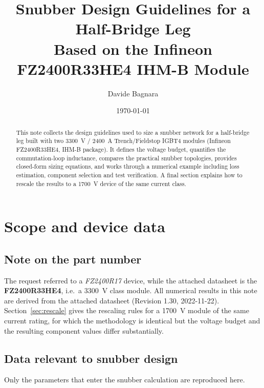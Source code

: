 \documentclass[11pt,a4paper]{article}
\title{Snubber Design Guidelines for a Half-Bridge Leg\\
Based on the Infineon FZ2400R33HE4 IHM-B Module}
\author{Davide Bagnara}
\date{\today}
\begin{document}
\maketitle

\begin{abstract}
This note collects the design guidelines used to size a snubber network for a
half-bridge leg built with two \SI{3300}{\volt} / \SI{2400}{\ampere}
Trench/Fieldstop IGBT4 modules (Infineon FZ2400R33HE4, IHM-B package).
It defines the voltage budget, quantifies the commutation-loop inductance,
compares the practical snubber topologies, provides closed-form sizing
equations, and works through a numerical example including loss estimation,
component selection and test verification. A final section explains how to
rescale the results to a \SI{1700}{\volt} device of the same current class.
\end{abstract}

\tableofcontents

\section{Scope and device data}

\subsection{Note on the part number}

The request referred to a \emph{FZ2400R17} device, while the attached datasheet
is the \textbf{FZ2400R33HE4}, i.e.\ a \SI{3300}{\volt} class module.
All numerical results in this note are derived from the attached datasheet
(Revision 1.30, 2022-11-22). Section~\ref{sec:rescale} gives the rescaling
rules for a \SI{1700}{\volt} module of the same current rating, for which the
methodology is identical but the voltage budget and the resulting component
values differ substantially.

\subsection{Data relevant to snubber design}

Only the parameters that enter the snubber calculation are reproduced here.
\end{document}
